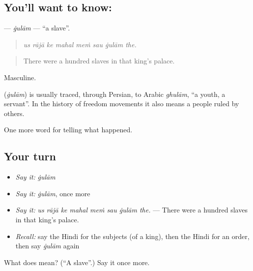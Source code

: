 \subsection*{You'll want to know: }
\textbf{} — \emph{ġulām} — \textquotedblleft{}a slave\textquotedblright{}.

\begin{quote}
       
\end{quote}

\begin{quote}
\emph{us rājā ke mahal meṁ sau ġulām the.}
\end{quote}

\begin{quote}
There were a hundred slaves in that king's palace.
\end{quote}

Masculine.

\begin{cousinweb}
\textbf{} (\emph{ġulām}) is usually traced, through Persian, to Arabic \emph{ghulām}, \textquotedblleft{}a youth, a servant\textquotedblright{}. In the history of freedom movements it also means a people ruled by others.
\end{cousinweb}

\begin{grammarlens}[title={What you've built}]
One more word for telling what happened.
\end{grammarlens}

\subsection*{Your turn}
\begin{itemize}
\raggedright
  \item \emph{Say it:} \emph{ġulām}
  \item \emph{Say it:} \emph{ġulām}, once more
  \item \emph{Say it:} \emph{us rājā ke mahal meṁ sau ġulām the.} — There were a hundred slaves in that king's palace.
  \item \emph{Recall:} say the Hindi for the subjects (of a king), then the Hindi for an order, then say \emph{ġulām} again
\end{itemize}

\begin{tcolorbox}[breakable,colback=teal!4,colframe=teal!35!black,title={Before you move on}]
What does  mean? (\textquotedblleft{}A slave\textquotedblright{}.) Say it once more.
\end{tcolorbox}
